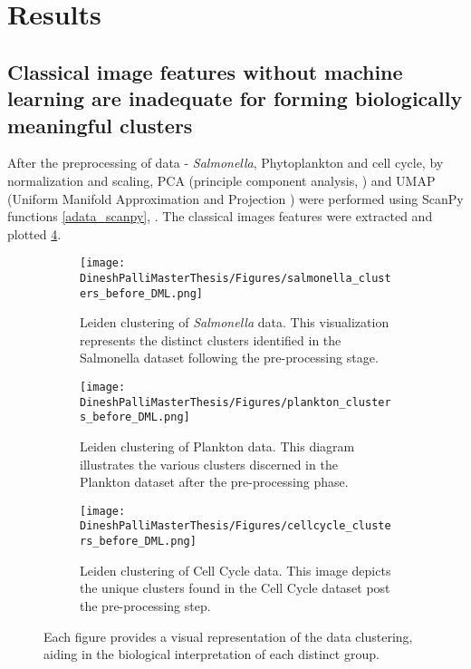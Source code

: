 \documentclass[12pt,a4paper]{article}
\begin{document}
\newpage
\section{Results}
\subsection{Classical image features without machine learning are inadequate for forming biologically meaningful clusters}
After the preprocessing of data - \textit{Salmonella}, Phytoplankton and cell cycle, by normalization and scaling, PCA (principle component analysis, \cite{pca}) and UMAP (Uniform Manifold Approximation and Projection \cite{umap}) were performed using ScanPy functions \ref{adata_scanpy}, \cite{pca}. The classical images features were extracted and plotted \ref{multifig1:overall_figure}.

\begin{figure}
  \centering
  \begin{subfigure}{\linewidth}
    \texttt{[image: DineshPalliMasterThesis/Figures/salmonella\_clusters\_before\_DML.png]}
    \caption{Leiden clustering of \textit{Salmonella} data. This visualization represents the distinct clusters identified in the Salmonella dataset following the pre-processing stage.}
    \label{multifig1:image_a}
  \end{subfigure}
  \hfill
  \begin{subfigure}{\linewidth}
    \texttt{[image: DineshPalliMasterThesis/Figures/plankton\_clusters\_before\_DML.png]}
    \caption{Leiden clustering of Plankton data. This diagram illustrates the various clusters discerned in the Plankton dataset after the pre-processing phase.}
    \label{multifig1:image_b}
  \end{subfigure}
  \hfill
  \begin{subfigure}{\linewidth}
    \texttt{[image: DineshPalliMasterThesis/Figures/cellcycle\_clusters\_before\_DML.png]}
    \caption{Leiden clustering of Cell Cycle data. This image depicts the unique clusters found in the Cell Cycle dataset post the pre-processing step.}
    \label{multifig1:image_c}
  \end{subfigure}
  \caption[Data clustering on classical image features]{Each figure provides a visual representation of the data clustering, aiding in the biological interpretation of each distinct group.}
  \label{multifig1:overall_figure}
\end{figure}
\end{document}
